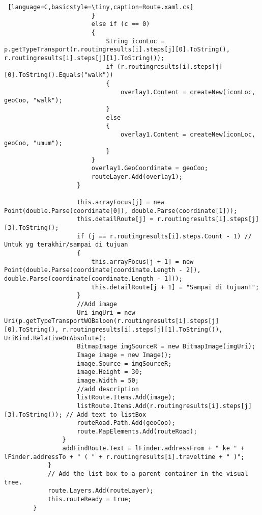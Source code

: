 \begin{lstlisting} [language=C,basicstyle=\tiny,caption=Route.xaml.cs]
                        }
                        else if (c == 0)
                        {
                            String iconLoc = p.getTypeTransport(r.routingresults[i].steps[j][0].ToString(), r.routingresults[i].steps[j][1].ToString());
                            if (r.routingresults[i].steps[j][0].ToString().Equals("walk"))
                            {
                                overlay1.Content = createNew(iconLoc, geoCoo, "walk");
                            }
                            else
                            {
                                overlay1.Content = createNew(iconLoc, geoCoo, "umum");
                            }
                        }
                        overlay1.GeoCoordinate = geoCoo;
                        routeLayer.Add(overlay1);
                    }

                    this.arrayFocus[j] = new Point(double.Parse(coordinate[0]), double.Parse(coordinate[1]));
                    this.detailRoute[j] = r.routingresults[i].steps[j][3].ToString();
                    if (j == r.routingresults[i].steps.Count - 1) // Untuk yg terakhir/sampai di tujuan
                    {
                        this.arrayFocus[j + 1] = new Point(double.Parse(coordinate[coordinate.Length - 2]), double.Parse(coordinate[coordinate.Length - 1]));
                        this.detailRoute[j + 1] = "Sampai di tujuan!";
                    }
                    //Add image 
                    Uri imgUri = new Uri(p.getTypeTransportWOBaloon(r.routingresults[i].steps[j][0].ToString(), r.routingresults[i].steps[j][1].ToString()), UriKind.RelativeOrAbsolute);
                    BitmapImage imgSourceR = new BitmapImage(imgUri);
                    Image image = new Image();
                    image.Source = imgSourceR;
                    image.Height = 30;
                    image.Width = 50;
                    //add description
                    listRoute.Items.Add(image);
                    listRoute.Items.Add(r.routingresults[i].steps[j][3].ToString()); // Add text to listBox
                    routeRoad.Path.Add(geoCoo);
                    route.MapElements.Add(routeRoad);
                }
                addFindRoute.Text = lFinder.addressFrom + " ke " + lFinder.addressTo + " ( " + r.routingresults[i].traveltime + " )";
            }
            // Add the list box to a parent container in the visual tree.
            route.Layers.Add(routeLayer);
            this.routeReady = true;
        }


\end{lstlisting}
